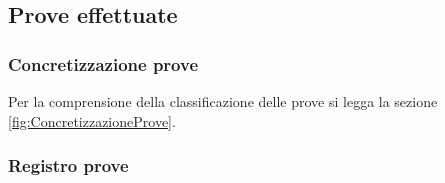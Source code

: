 \documentclass[../../SperimentazioniPratiche.tex]{subfiles}
\begin{document}
\newcommand{\ok}{\textcolor{cadmiumgreen}{OK}} %
\newcommand{\ns}{\textcolor{red}{N.S.}} %
\newcommand{\nd}{\textcolor{red}{N.D.}} %

\newcommand{\dispositivoA}{Moto G 2015}		
\newcommand{\dispositivoB}{Nexus 4}
\newcommand{\dispositivoC}{Galaxy S4 mini}

	\subsection{Prove effettuate}
	
		\subsubsection{Concretizzazione prove}
			Per la comprensione della classificazione delle prove si legga la sezione \ref{fig:ConcretizzazioneProve}.
			
		
			
		\subsubsection{Registro prove}
		
\end{document}
